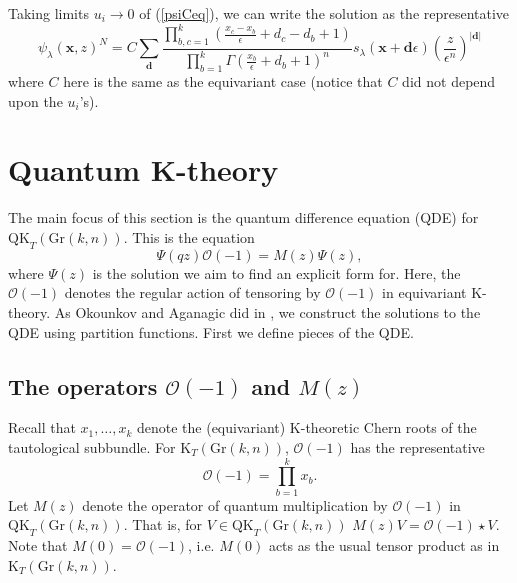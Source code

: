 \documentclass[12pt]{article}
\newcommand{\OC}{\mathcal{O}}
\theoremstyle{plain}
\theoremstyle{definition}
\newcommand{\reese}[1]{\textcolor{blue}{reese: #1}}
\newcommand{\xb}{\boldsymbol{x}}
\newcommand{\db}{\boldsymbol{d}}
\begin{document}
Taking limits $u_i \to 0$ of (\ref{psiCeq}), we can write the solution as the representative
\begin{equation*}
\psi_\lambda (\xb,z)^N = C \sum_{\db} \frac{\prod \limits_{b,c=1}^k \left(\frac{x_c-x_b}{\epsilon}+d_c-d_b+1\right) }{\prod \limits_{b=1} ^k  \Gamma \left(\frac{x_b}{\epsilon}+d_b+1\right)^n} s_\lambda (\xb+\db \epsilon) \left(\frac{z}{\epsilon^n}\right)^{|\db|}
\end{equation*}
where $C$ here is the same as the equivariant case (notice that $C$ did not depend upon the $u_i$'s).


\section{Quantum K-theory} \label{quantumktheorysection}

The main focus of this section is the quantum difference equation (QDE) for $\textrm{QK}_T(\textrm{Gr}(k,n))$. This is the equation
\begin{equation}
    \Psi(q z) \OC(-1) = M(z) \Psi(z),
\end{equation}
where $\Psi(z)$ is the solution we aim to find an explicit form for. Here, the $\OC(-1)$ denotes the regular action of tensoring by $\OC(-1)$ in equivariant K-theory. As Okounkov and Aganagic did in \cite{aganagic2017quasimapcountsbetheeigenfunctions}, we construct the solutions to the QDE using partition functions. First we define pieces of the QDE.


\subsection{The operators \texorpdfstring{$\OC(-1)$}{O(-1)} and \texorpdfstring{$M(z)$}{M(z)} }
Recall that $x_1, \ldots, x_k$ denote the (equivariant) K-theoretic Chern roots of the tautological subbundle. For $\textrm{K}_T(\textrm{Gr}(k,n))$,
$\OC(-1)$ has the representative
$$ 
\OC(-1)= \prod_{b=1} ^k x_b. 
$$
Let $M(z)$ denote the operator of quantum multiplication by $\OC(-1)$ in $\textrm{QK}_T(\textrm{Gr}(k,n))$. That is, for $V \in \mathrm{QK}_T (\mathrm{Gr}(k,n))$ $M(z) V = \mathcal{O} (-1) \star V$. Note that $M(0) =\OC(-1)$, i.e. $M(0)$ acts as the usual tensor product as in $\mathrm{K}_T (\mathrm{Gr}(k,n)).$
\end{document}
